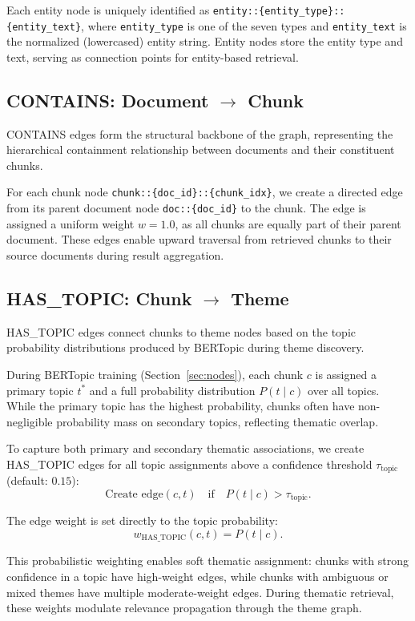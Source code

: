 \documentclass[10pt]{article}
\begin{document}
Each entity node is uniquely identified as \texttt{entity::\{entity\_type\}::\{entity\_text\}}, where \texttt{entity\_type} is one of the seven types and \texttt{entity\_text} is the normalized (lowercased) entity string. Entity nodes store the entity type and text, serving as connection points for entity-based retrieval.

\subsection{CONTAINS: Document $\to$ Chunk}

CONTAINS edges form the structural backbone of the graph, representing the hierarchical containment relationship between documents and their constituent chunks.

For each chunk node \texttt{chunk::\{doc\_id\}::\{chunk\_idx\}}, we create a directed edge from its parent document node \texttt{doc::\{doc\_id\}} to the chunk. The edge is assigned a uniform weight $w = 1.0$, as all chunks are equally part of their parent document. These edges enable upward traversal from retrieved chunks to their source documents during result aggregation.

\subsection{HAS\_TOPIC: Chunk $\to$ Theme}

HAS\_TOPIC edges connect chunks to theme nodes based on the topic probability distributions produced by BERTopic during theme discovery.

During BERTopic training (Section~\ref{sec:nodes}), each chunk $c$ is assigned a primary topic $t^*$ and a full probability distribution $P(t \mid c)$ over all topics. While the primary topic has the highest probability, chunks often have non-negligible probability mass on secondary topics, reflecting thematic overlap.

To capture both primary and secondary thematic associations, we create HAS\_TOPIC edges for all topic assignments above a confidence threshold $\tau_{\text{topic}}$ (default: $0.15$):
\[
\text{Create edge}(c, t) \quad \text{if} \quad P(t \mid c) > \tau_{\text{topic}}.
\]

The edge weight is set directly to the topic probability:
\[
w_{\text{HAS\_TOPIC}}(c, t) = P(t \mid c).
\]

This probabilistic weighting enables soft thematic assignment: chunks with strong confidence in a topic have high-weight edges, while chunks with ambiguous or mixed themes have multiple moderate-weight edges. During thematic retrieval, these weights modulate relevance propagation through the theme graph.
\end{document}
